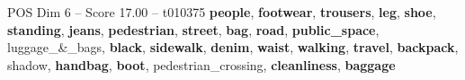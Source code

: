 \begin{textsample}{POS Dim 6 – Score 17.00 – t010375}  \label{ex:f6_pos_011}
\textbf{people}, \textbf{footwear}, \textbf{trousers}, \textbf{leg}, \textbf{shoe}, \textbf{standing}, \textbf{jeans}, \textbf{pedestrian}, \textbf{street}, \textbf{bag}, \textbf{road}, \textbf{public\_space}, luggage\_\&\_bags, \textbf{black}, \textbf{sidewalk}, \textbf{denim}, \textbf{waist}, \textbf{walking}, \textbf{travel}, \textbf{backpack}, shadow, \textbf{handbag}, \textbf{boot}, pedestrian\_crossing, \textbf{cleanliness}, \textbf{baggage}

\end{textsample}
